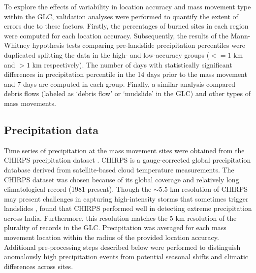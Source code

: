 \documentclass[nhess, manuscript]{copernicus}
\begin{document}
To explore the effects of variability in location accuracy and mass movement type within the GLC, validation analyses were performed to quantify the extent of errors due to these factors. Firstly, the percentages of burned sites in each region were computed for each location accuracy. Subsequently, the results of the Mann-Whitney hypothesis tests comparing pre-landslide precipitation percentiles were duplicated splitting the data in the high- and low-accuracy groups ($<=1\textrm{ km}$ and $> 1\textrm{ km}$ respectively). The number of days with statistically significant differences in precipitation percentile in the 14 days prior to the mass movement and 7 days are computed in each group. Finally, a similar analysis compared debris flows (labeled as ‘debris flow’ or ‘mudslide’ in the GLC) and other types of mass movements.


\subsection{Precipitation data}\label{sec:precipitation-data}

Time series of precipitation at the mass movement sites were obtained from the 
CHIRPS precipitation dataset \citep{funkClimateHazardsInfrared2015}. CHIRPS is a gauge-corrected global precipitation database derived from satellite-based cloud temperature measurements. The CHIRPS dataset was chosen because of its global coverage and relatively long climatological record (1981-present). Though the $\sim5.5\textrm{ km}$ resolution of CHIRPS may present challenges in capturing high-intensity storms that sometimes trigger landslides \citep{hongUseSatelliteRemote2007}, \citet{gupta2020assessment} found that CHIRPS performed well in detecting extreme precipitation across India. Furthermore, this resolution matches the 5 km resolution of the plurality of records in the GLC. 
Precipitation was averaged for each mass movement location within the radius
of the provided location accuracy. Additional pre-processing steps described 
below were performed to distinguish anomalously high precipitation events from 
potential seasonal shifts and climatic differences across sites. 
\end{document}
